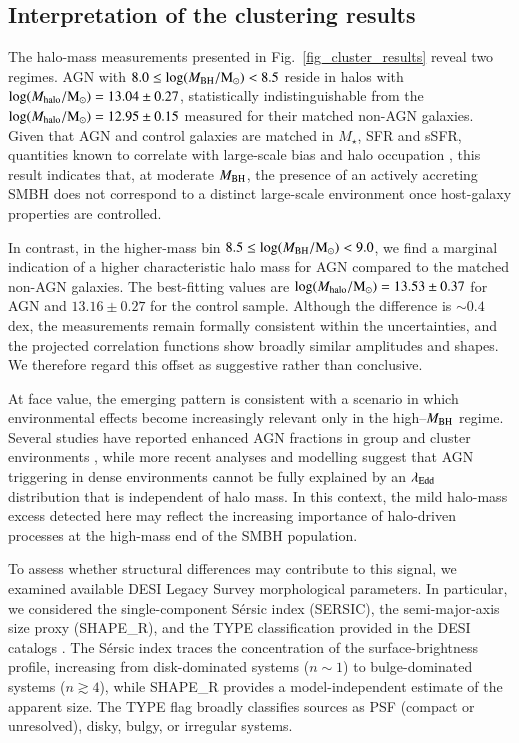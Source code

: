 \documentclass{aa}
\begin{document}
\subsection{Interpretation of the clustering results}
\label{sec:interpretation}


The halo-mass measurements presented in Fig.~\ref{fig_cluster_results} reveal two regimes. 
AGN with 
$8.0 \le \log(M_{\rm BH}/{\rm M_\odot}) < 8.5$
reside in halos with 
$\log(M_{\rm halo}/{\rm M_\odot})=13.04\pm0.27$, 
statistically indistinguishable from the 
$\log(M_{\rm halo}/{\rm M_\odot})=12.95\pm0.15$ 
measured for their matched non-AGN galaxies. 
Given that AGN and control galaxies are matched in $M_\star$, SFR and sSFR, quantities known to correlate with large-scale bias and halo occupation 
\citep[e.g.][]{Georgakakis2014, Aird2019, Mountrichas2019, Allevato2019}, this result indicates that, at moderate $M_{\rm BH}$, the presence of an actively accreting SMBH does not correspond to a distinct large-scale environment once host-galaxy properties are controlled.

In contrast, in the higher-mass bin 
$8.5 \le \log(M_{\rm BH}/{\rm M_\odot}) < 9.0$, 
we find a marginal indication of a higher characteristic halo mass for AGN compared to the matched non-AGN galaxies. 
The best-fitting values are 
$\log(M_{\rm halo}/{\rm M_\odot})=13.53\pm0.37$ 
for AGN and 
$13.16\pm0.27$ 
for the control sample. 
Although the difference is $\sim0.4$\,dex, the measurements remain formally consistent within the uncertainties, and the projected correlation functions show broadly similar amplitudes and shapes. 
We therefore regard this offset as suggestive rather than conclusive.

At face value, the emerging pattern is consistent with a scenario in which environmental effects become increasingly relevant only in the high--$M_{\rm BH}$ regime. 
Several studies have reported enhanced AGN fractions in group and cluster environments 
\citep[e.g.][]{Martini2007, Martini2009, Martini2013}, 
while more recent analyses and modelling 
\citep[e.g.][]{Georgakakis2023, Munoz2024} 
suggest that AGN triggering in dense environments cannot be fully explained by an $\lambda_{\rm Edd}$ distribution that is independent of halo mass. 
In this context, the mild halo-mass excess detected here may reflect the increasing importance of halo-driven processes at the high-mass end of the SMBH population.

To assess whether structural differences may contribute to this signal, we examined available DESI Legacy Survey morphological parameters. In particular, we considered the single-component Sérsic index (SERSIC), the semi-major-axis size proxy (SHAPE\_R), and the TYPE classification provided in the DESI catalogs \citep{Quilley2025, Romelli2025}. The Sérsic index traces the concentration of the surface-brightness profile, increasing from disk-dominated systems ($n \sim 1$) to bulge-dominated systems ($n \gtrsim 4$), while SHAPE\_R provides a model-independent estimate of the apparent size. The TYPE flag broadly classifies sources as PSF (compact or unresolved), disky, bulgy, or irregular systems.
\end{document}
